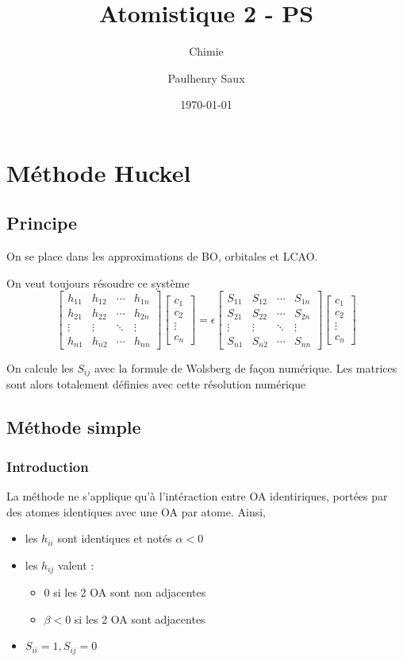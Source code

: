 \documentclass[french]{yLectureNote}
\title{Atomistique 2 - PS}
\subtitle{Chimie}
\author{Paulhenry Saux}
\date{\today}
\begin{document}
\setcounter{chapter}{2}
\chapter{Méthode Huckel}
\section{Principe}
On se place dans les approximations de BO, orbitales et LCAO.

On veut toujours résoudre ce système
\[
\begin{bmatrix}
h_{11} & h_{12} & \cdots & h_{1n} \\
h_{21} & h_{22} & \cdots & h_{2n} \\
\vdots & \vdots & \ddots & \vdots \\
h_{n1} & h_{n2} & \cdots & h_{nn}
\end{bmatrix}
\begin{bmatrix}
c_1 \\
c_2 \\
\vdots \\
c_n
\end{bmatrix}
= \epsilon
\begin{bmatrix}
S_{11} & S_{12} & \cdots & S_{1n} \\
S_{21} & S_{22} & \cdots & S_{2n} \\
\vdots & \vdots & \ddots & \vdots \\
S_{n1} & S_{n2} & \cdots & S_{nn}
\end{bmatrix}
\begin{bmatrix}
c_1 \\
c_2 \\
\vdots \\
c_n
\end{bmatrix}
\]

On calcule les \(S_{ij}\) avec la formule de Wolsberg de façon numérique. Les matrices sont alors totalement définies avec cette résolution numérique

\section{Méthode simple}
\subsection{Introduction}
La méthode ne s'applique qu'à l'intéraction entre OA identiriques, portées par des atomes identiques avec une OA par atome. Ainsi,
\begin{itemize}
 \item les \(h_{ii}\) sont identiques et notés \(\alpha < 0\)
 \item les \(h_{ij}\) valent :
 \begin{itemize}
  \item 0 si les 2 OA sont non adjacentes
  \item \(\beta <0\) si les 2 OA sont adjacentes
 \end{itemize}
\item \(S_{ii} = 1, S_{ij} = 0 \)
\end{itemize}
\end{document}
